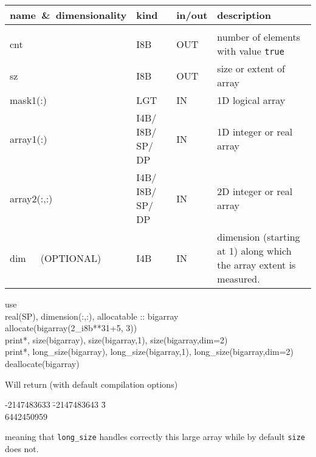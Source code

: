 \begin{arguments}
{
\begin{tabular}{p{0.30\hsize} p{0.05\hsize} p{0.08\hsize} p{0.47\hsize}} \hline  
\textbf{name~\&~dimensionality} & \textbf{kind} & \textbf{in/out} & \textbf{description} \\ \hline
                   &   &   &                           \\ %
cnt & I8B & OUT & number of elements with value {\tt true} \\
sz & I8B & OUT & size or extent of array \\
mask1(:) & LGT & IN & 1D logical array \\
array1(:) & I4B/ I8B/ SP/ DP & IN & 1D integer or real array \\
array2(:,:) & I4B/ I8B/ SP/ DP & IN & 2D integer or real array \\
dim\ \ \ (OPTIONAL) & I4B & IN & dimension (starting at 1) along which the array
extent is measured.
\end{tabular}
}
\end{arguments}


\begin{example}
{
 use  \\
 real(SP), dimension(:,:), allocatable :: bigarray \\
 allocate(bigarray(2\_i8b**31+5, 3)) \\
 print*,       size(bigarray),       size(bigarray,1),       size(bigarray,dim=2) \\
 print*, long\_size(bigarray), long\_size(bigarray,1), long\_size(bigarray,dim=2) \\
 deallocate(bigarray)
}
{Will return (with default compilation options)
\begin{tabbing}
     -2147483633 \= -2147483643  \= 3 \\
     6442450959     
\end{tabbing}
meaning that {\tt long\_size} handles correctly this large array while by default
{\tt size} does not.}
\end{example}



